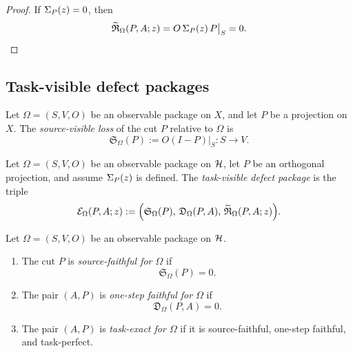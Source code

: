 \begin{proof}
If \(\Sigma_{P}(z)=0\), then
\[
\widetilde{\mathfrak R}_{\Omega}(P,A;z)
=
O\,\Sigma_{P}(z)\,P\big|_{S}
=
0.
\]
\end{proof}

\subsection{Task-visible defect packages}

\begin{definition}
\label{def:source-visible-loss}
Let \(\Omega=(S,V,O)\) be an observable package on \(X\), and let \(P\) be a
projection on \(X\). The \emph{source-visible loss} of the cut \(P\) relative
to \(\Omega\) is
\[
\mathfrak S_{\Omega}(P):=O(I-P)\big|_S:S\to V.
\]
\end{definition}

\begin{definition}
\label{def:task-visible-defect-package}
Let \(\Omega=(S,V,O)\) be an observable package on \(\mathcal{H}\), let \(P\) be an
orthogonal projection, and assume \(\Sigma_{P}(z)\) is defined. The
\emph{task-visible defect package} is the triple
\[
\mathcal E_{\Omega}(P,A;z)
:=
\Bigl(
\mathfrak S_{\Omega}(P),\,
\mathfrak D_{\Omega}(P,A),\,
\widetilde{\mathfrak R}_{\Omega}(P,A;z)
\Bigr).
\]
\end{definition}

\begin{definition}
\label{def:task-visible-faithfulness}
Let \(\Omega=(S,V,O)\) be an observable package on \(\mathcal{H}\).
\begin{enumerate}[label=(\roman*), leftmargin=2em, itemsep=0.2em]
\item The cut \(P\) is \emph{source-faithful for \(\Omega\)} if
      \[
      \mathfrak S_{\Omega}(P)=0.
      \]
\item The pair \((A,P)\) is \emph{one-step faithful for \(\Omega\)} if
      \[
      \mathfrak D_{\Omega}(P,A)=0.
      \]
\item The pair \((A,P)\) is \emph{task-exact for \(\Omega\)} if it is
      source-faithful, one-step faithful, and task-perfect.
\end{enumerate}
\end{definition}

